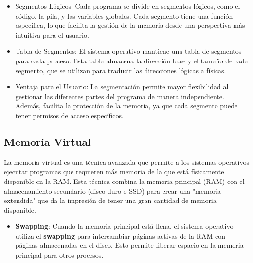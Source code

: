 \begin{itemize}
	\item Segmentos Lógicos: Cada programa se divide en segmentos lógicos, como el código, la pila, y las variables globales. Cada segmento tiene una función específica, lo que facilita la gestión de la memoria desde una perspectiva más intuitiva para el usuario.
	\item Tabla de Segmentos: El sistema operativo mantiene una tabla de segmentos para cada proceso. Esta tabla almacena la dirección base y el tamaño de cada segmento, que se utilizan para traducir las direcciones lógicas a físicas.
	\item Ventaja para el Usuario: La segmentación permite mayor flexibilidad al gestionar las diferentes partes del programa de manera independiente. Además, facilita la protección de la memoria, ya que cada segmento puede tener permisos de acceso específicos.
\end{itemize}

	


 \subsection{Memoria Virtual}
La memoria virtual es una técnica avanzada que permite a los sistemas operativos ejecutar programas que requieren más memoria de la que está físicamente disponible en la RAM. Esta técnica combina la memoria principal (RAM) con el almacenamiento secundario (disco duro o SSD) para crear una "memoria extendida" que da la impresión de tener una gran cantidad de memoria disponible.

\begin{itemize}

	
	\item \textbf{Swapping}: Cuando la memoria principal está llena, el sistema operativo utiliza el  \textbf{swapping} para intercambiar páginas activas de la RAM con páginas almacenadas en el disco. Esto permite liberar espacio en la memoria principal para otros procesos.
	
\end{itemize}
 